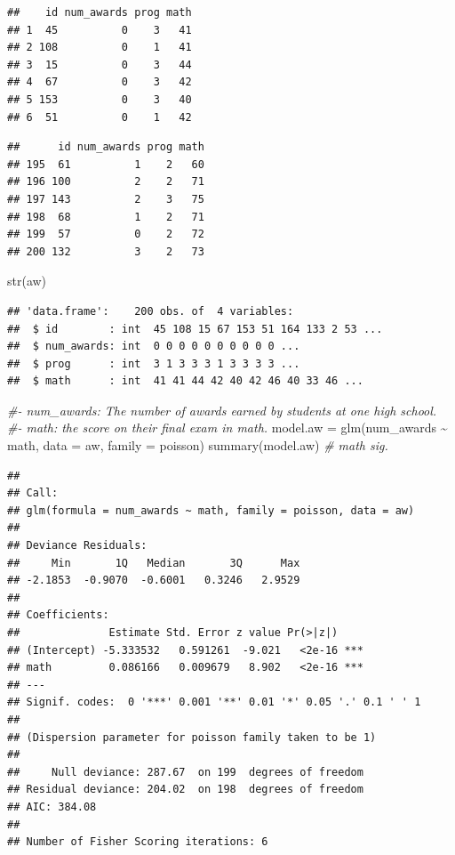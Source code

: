 \documentclass[
]{book}
\makeatletter
\newenvironment{Shaded}{\begin{snugshade}}{\end{snugshade}}
\newcommand{\AttributeTok}[1]{\textcolor[rgb]{0.61,0.61,0.61}{#1}}
\newcommand{\CommentTok}[1]{\textcolor[rgb]{0.37,0.37,0.37}{\textit{#1}}}
\newcommand{\FunctionTok}[1]{\textcolor[rgb]{0,0,0}{#1}}
\newcommand{\NormalTok}[1]{#1}
\newcommand{\OtherTok}[1]{\textcolor[rgb]{0.37,0.37,0.37}{#1}}
\newcommand{\SpecialCharTok}[1]{\textcolor[rgb]{0,0,0}{#1}}
\newenvironment{kframe}{%
\medskip{}
\setlength{\fboxsep}{.8em}
 \def\at@end@of@kframe{}%
 \ifinner\ifhmode%
  \def\at@end@of@kframe{\end{minipage}}%
  \begin{minipage}{\columnwidth}%
 \fi\fi%
 \def\FrameCommand##1{\hskip\@totalleftmargin \hskip-\fboxsep
 \colorbox{shadecolor}{##1}\hskip-\fboxsep
     \hskip-\linewidth \hskip-\@totalleftmargin \hskip\columnwidth}%
 \MakeFramed {\advance\hsize-\width
   \@totalleftmargin\z@ \linewidth\hsize
   \@setminipage}}%
 {\par\unskip\endMakeFramed%
 \at@end@of@kframe}
\renewenvironment{Shaded}{\begin{kframe}}{\end{kframe}}
\makeatother
\begin{document}
\begin{verbatim}
##    id num_awards prog math
## 1  45          0    3   41
## 2 108          0    1   41
## 3  15          0    3   44
## 4  67          0    3   42
## 5 153          0    3   40
## 6  51          0    1   42
\end{verbatim}

\begin{verbatim}
##      id num_awards prog math
## 195  61          1    2   60
## 196 100          2    2   71
## 197 143          2    3   75
## 198  68          1    2   71
## 199  57          0    2   72
## 200 132          3    2   73
\end{verbatim}

\begin{Shaded}
\begin{Highlighting}[]
\FunctionTok{str}\NormalTok{(aw)}
\end{Highlighting}
\end{Shaded}

\begin{verbatim}
## 'data.frame':    200 obs. of  4 variables:
##  $ id        : int  45 108 15 67 153 51 164 133 2 53 ...
##  $ num_awards: int  0 0 0 0 0 0 0 0 0 0 ...
##  $ prog      : int  3 1 3 3 3 1 3 3 3 3 ...
##  $ math      : int  41 41 44 42 40 42 46 40 33 46 ...
\end{verbatim}

\begin{Shaded}
\begin{Highlighting}[]
\CommentTok{\#{-} num\_awards: The number of awards earned by students at one high school.}
\CommentTok{\#{-} math: the score on their final exam in math.}
\NormalTok{model.aw }\OtherTok{=} \FunctionTok{glm}\NormalTok{(num\_awards }\SpecialCharTok{\textasciitilde{}}\NormalTok{ math, }\AttributeTok{data =}\NormalTok{ aw, }\AttributeTok{family =}\NormalTok{ poisson)}
\FunctionTok{summary}\NormalTok{(model.aw)  }\CommentTok{\# math sig.}
\end{Highlighting}
\end{Shaded}

\begin{verbatim}
## 
## Call:
## glm(formula = num_awards ~ math, family = poisson, data = aw)
## 
## Deviance Residuals: 
##     Min       1Q   Median       3Q      Max  
## -2.1853  -0.9070  -0.6001   0.3246   2.9529  
## 
## Coefficients:
##              Estimate Std. Error z value Pr(>|z|)    
## (Intercept) -5.333532   0.591261  -9.021   <2e-16 ***
## math         0.086166   0.009679   8.902   <2e-16 ***
## ---
## Signif. codes:  0 '***' 0.001 '**' 0.01 '*' 0.05 '.' 0.1 ' ' 1
## 
## (Dispersion parameter for poisson family taken to be 1)
## 
##     Null deviance: 287.67  on 199  degrees of freedom
## Residual deviance: 204.02  on 198  degrees of freedom
## AIC: 384.08
## 
## Number of Fisher Scoring iterations: 6
\end{verbatim}
\end{document}
